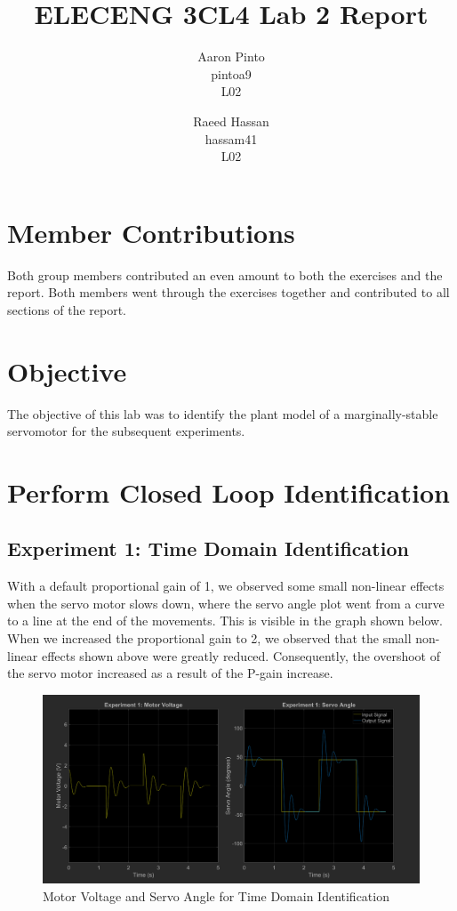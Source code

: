 \documentclass[12pt]{article}
\title{ELECENG 3CL4 Lab 2 Report}
\author{
    Aaron Pinto \\
    pintoa9 \\
    L02
    \and
    Raeed Hassan \\
    hassam41 \\
    L02
}
\begin{document}
\maketitle
\clearpage

\section*{Member Contributions}
Both group members contributed an even amount to both the exercises and the report. Both members went through the exercises together and contributed to all sections of the report.

\section*{Objective} %
The objective of this lab was to identify the plant model of a marginally-stable servomotor for the subsequent experiments.

\clearpage
\setcounter{section}{2}
\section{Perform Closed Loop Identification}
\subsection{Experiment 1: Time Domain Identification}
With a default proportional gain of 1, we observed some small non-linear effects when the servo motor slows down, where the servo angle plot went from a curve to a line at the end of the movements. This is visible in the graph shown below.
When we increased the proportional gain to 2, we observed that the small non-linear effects shown above were greatly reduced. Consequently, the overshoot of the servo motor increased as a result of the P-gain increase.
\begin{figure}[h!]
    \centering
    \includegraphics[width=\textwidth]{exp1}
    \caption{\label{fig:exp1}Motor Voltage and Servo Angle for Time Domain Identification}
\end{figure}
\end{document}
